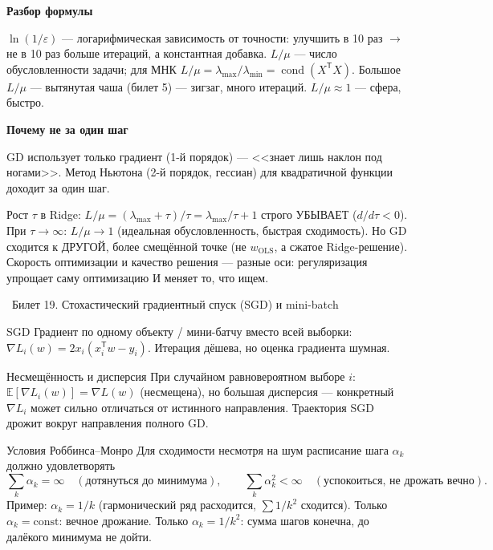 \documentclass[12pt, a4paper]{article}
\newcommand{\bilet}[2]{%
  \vspace{10pt}%
  \noindent\colorbox{qcolor}{\parbox{\dimexpr\linewidth-2\fboxsep\relax}{%
    \color{white}\large\bfseries\strut\ Билет #1. #2%
  }}%
  \nopagebreak\vspace{5pt}\par\nopagebreak%
}
\newcommand{\qsub}[1]{%
  \vspace{5pt}%
  {\bfseries\color{defblue} #1}%
  \par\vspace{2pt}%
}
\newcommand{\E}{\mathbb{E}}
\newcommand{\cond}{\operatorname{cond}}
\newcommand{\tr}{^{\mathsf{T}}}
\begin{document}
\qsub{Разбор формулы}
$\ln(1/\varepsilon)$ --- логарифмическая зависимость от точности: улучшить в 10 раз $\to$ не в 10 раз больше итераций, а константная добавка. $L/\mu$ --- число обусловленности задачи; для МНК $L/\mu = \lambda_{\max}/\lambda_{\min} = \cond(X\tr X)$. Большое $L/\mu$ --- вытянутая чаша (билет 5) --- зигзаг, много итераций. $L/\mu \approx 1$ --- сфера, быстро.

\qsub{Почему не за один шаг}
GD использует только градиент (1-й порядок) --- <<знает лишь наклон под ногами>>. Метод Ньютона (2-й порядок, гессиан) для квадратичной функции доходит за один шаг.

\begin{fishkabox}
Рост $\tau$ в Ridge: $L/\mu = (\lambda_{\max}+\tau)/\tau = \lambda_{\max}/\tau + 1$ строго УБЫВАЕТ ($d/d\tau < 0$). При $\tau \to \infty$: $L/\mu \to 1$ (идеальная обусловленность, быстрая сходимость). Но GD сходится к ДРУГОЙ, более смещённой точке (не $w_{\text{OLS}}$, а сжатое Ridge-решение). Скорость оптимизации и качество решения --- разные оси: регуляризация упрощает саму оптимизацию И меняет то, что ищем.
\end{fishkabox}

\bilet{19}{Стохастический градиентный спуск (SGD) и mini-batch}

\begin{defbox}{SGD}
Градиент по одному объекту / мини-батчу вместо всей выборки: $\nabla L_i(w) = 2 x_i(x_i\tr w - y_i)$. Итерация дёшева, но оценка градиента шумная.
\end{defbox}

\begin{propbox}{Несмещённость и дисперсия}
При случайном равновероятном выборе $i$: $\E[\nabla L_i(w)] = \nabla L(w)$ (несмещена), но большая дисперсия --- конкретный $\nabla L_i$ может сильно отличаться от истинного направления. Траектория SGD дрожит вокруг направления полного GD.
\end{propbox}

\begin{thmbox}{Условия Роббинса--Монро}
Для сходимости несмотря на шум расписание шага $\alpha_k$ должно удовлетворять
\[
  \sum_k \alpha_k = \infty \quad(\text{дотянуться до минимума}), \qquad \sum_k \alpha_k^2 < \infty \quad(\text{успокоиться, не дрожать вечно}).
\]
Пример: $\alpha_k = 1/k$ (гармонический ряд расходится, $\sum 1/k^2$ сходится). Только $\alpha_k = \text{const}$: вечное дрожание. Только $\alpha_k = 1/k^2$: сумма шагов конечна, до далёкого минимума не дойти.
\end{thmbox}
\end{document}
